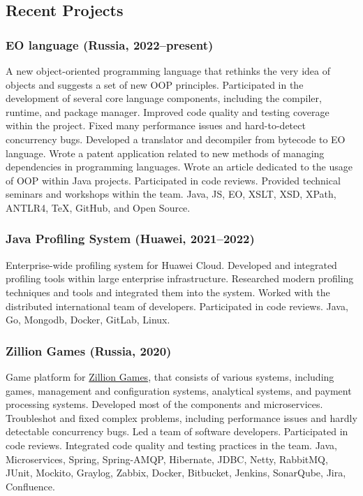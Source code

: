 \documentclass{vl}
\begin{document}
    \subsection*{Recent Projects}

    \subsubsection*{EO language (Russia, 2022--present)}
    A new object-oriented programming language
    that rethinks the very idea of objects and suggests a set of new OOP principles.
    Participated in the development of several core language components,
    including the compiler, runtime, and package manager.
    Improved code quality and testing coverage within the project.
    Fixed many performance issues and hard-to-detect concurrency bugs.
    Developed a translator and decompiler from bytecode to EO language.
    Wrote a patent application related to new methods of managing dependencies in programming languages.
    Wrote an article dedicated to the usage of OOP within Java projects.
    Participated in code reviews.
    Provided technical seminars and workshops within the team.
    Java, JS, EO, XSLT, XSD, XPath, ANTLR4, TeX, GitHub, and Open Source.

    \subsubsection*{Java Profiling System (Huawei, 2021--2022)}
    Enterprise-wide profiling system for Huawei Cloud.
    Developed and integrated profiling tools within large enterprise infrastructure.
    Researched modern profiling techniques and tools and integrated them into the system.
    Worked with the distributed international team of developers.
    Participated in code reviews.
    Java, Go, Mongodb, Docker, GitLab, Linux.

    \subsubsection*{Zillion Games (Russia, 2020)}
    Game platform for \href{http://zillion.games/}{Zillion Games}, that consists of various systems, including games,
    management and configuration systems, analytical systems, and payment processing systems.
    Developed most of the components and microservices.
    Troubleshot and fixed complex problems, including performance issues and hardly detectable concurrency bugs.
    Led a team of software developers.
    Participated in code reviews.
    Integrated code quality and testing practices in the team.
    Java, Microservices, Spring, Spring-AMQP, Hibernate, JDBC, Netty, RabbitMQ, JUnit, Mockito, Graylog, Zabbix, Docker,
    Bitbucket, Jenkins, SonarQube, Jira, Confluence.
\end{document}
